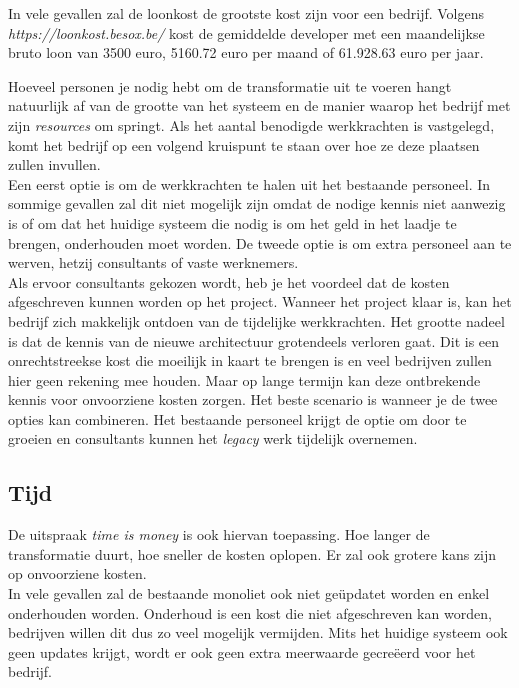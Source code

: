 In vele gevallen zal de loonkost de grootste kost zijn voor een bedrijf. Volgens \emph{https://loonkost.besox.be/} kost de gemiddelde developer met een maandelijkse bruto loon van 3500 euro, 5160.72 euro per maand of 61.928.63 euro per jaar.

Hoeveel personen je nodig hebt om de transformatie uit te voeren hangt natuurlijk af van de grootte van het systeem en de manier waarop het bedrijf met zijn \emph{resources} om springt. 
Als het aantal benodigde werkkrachten is vastgelegd, komt het bedrijf op een volgend kruispunt te staan over hoe ze deze plaatsen zullen invullen.\\ Een eerst optie is om de werkkrachten te halen uit het bestaande personeel. In sommige gevallen zal dit niet mogelijk zijn omdat de nodige kennis niet aanwezig is of om dat het huidige systeem die nodig is om het geld in het laadje te brengen, onderhouden moet worden. De tweede optie is om extra personeel aan te werven, hetzij consultants of vaste werknemers.\\ 
Als ervoor consultants gekozen wordt, heb je het voordeel dat de kosten afgeschreven kunnen worden op het project. Wanneer het project klaar is, kan het bedrijf zich makkelijk ontdoen van de tijdelijke werkkrachten.  Het grootte nadeel is dat de kennis van de nieuwe architectuur grotendeels verloren gaat. Dit is een onrechtstreekse kost die moeilijk in kaart te brengen is en veel bedrijven zullen hier geen rekening mee houden. Maar op lange termijn kan deze ontbrekende kennis voor onvoorziene kosten zorgen. Het beste scenario is wanneer je de twee opties kan combineren. Het bestaande personeel krijgt de optie om door te groeien en consultants kunnen het \emph{legacy} werk tijdelijk overnemen.

\subsection{Tijd}

De uitspraak \emph{time is money} is ook hiervan toepassing. Hoe langer de transformatie duurt, hoe sneller de kosten oplopen. Er zal ook grotere kans zijn op onvoorziene kosten.\\
In vele gevallen zal de bestaande monoliet ook niet geüpdatet worden en enkel onderhouden worden. Onderhoud is een kost die niet afgeschreven kan worden, bedrijven willen dit dus zo veel mogelijk vermijden. Mits het huidige systeem ook geen updates krijgt, wordt er ook geen extra meerwaarde gecreëerd voor het bedrijf.

